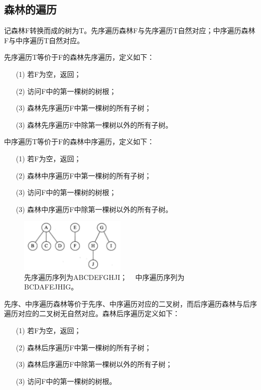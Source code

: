 \documentclass[10pt]{article}
\begin{document}
\subsection{森林的遍历}
记森林F转换而成的树为T。先序遍历森林F与先序遍历T自然对应；中序遍历森林F与中序遍历T自然对应。

先序遍历T等价于F的森林先序遍历，定义如下：
\begin{itemize}
\item[(1)] 若F为空，返回； 
\item[(2)] 访问F中的第一棵树的树根；
\item[(3)] 森林先序遍历F中第一棵树的所有子树；
\item[(3)] 森林先序遍历F中除第一棵树以外的所有子树。
\end{itemize} 

中序遍历T等价于F的森林中序遍历，定义如下：
\begin{itemize}
\item[(1)] 若F为空，返回； 
\item[(2)] 森林中序遍历F中第一棵树的所有子树；
\item[(3)] 访问F中的第一棵树的树根；
\item[(3)] 森林中序遍历F中除第一棵树以外的所有子树。
\end{itemize} 

\begin{figure}[htbp]
\centering
\includegraphics[width=2in]{fig/forest.pdf}
\caption{先序遍历序列为ABCDEFGHJI； ~
中序遍历序列为BCDAFEJHIG。}
\end{figure}

先序、中序遍历森林等价于先序、中序遍历对应的二叉树，而后序遍历森林与后序遍历对应的二叉树无自然对应。森林后序遍历定义如下：
\begin{itemize}
\item[(1)] 若F为空，返回； 
\item[(2)] 森林后序遍历F中第一棵树的所有子树；
\item[(3)] 森林后序遍历F中除第一棵树以外的所有子树；
\item[(3)] 访问F中的第一棵树的树根。
\end{itemize} 

\end{document}
